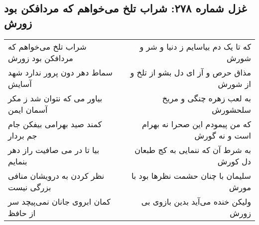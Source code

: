 \begin{center}
\section*{غزل شماره ۲۷۸: شراب تلخ می‌خواهم که مردافکن بود زورش}
\label{sec:sh278}
\begin{longtable}{l p{0.5cm} r}
شراب تلخ می‌خواهم که مردافکن بود زورش
&&
که تا یک دم بیاسایم ز دنیا و شر و شورش
\\
سماط دهر دون پرور ندارد شهد آسایش
&&
مذاق حرص و آز ای دل بشو از تلخ و از شورش
\\
بیاور می که نتوان شد ز مکر آسمان ایمن
&&
به لعب زهره چنگی و مریخ سلحشورش
\\
کمند صید بهرامی بیفکن جام جم بردار
&&
که من پیمودم این صحرا نه بهرام است و نه گورش
\\
بیا تا در می صافیت راز دهر بنمایم
&&
به شرط آن که ننمایی به کج طبعان دل کورش
\\
نظر کردن به درویشان منافی بزرگی نیست
&&
سلیمان با چنان حشمت نظرها بود با مورش
\\
کمان ابروی جانان نمی‌پیچد سر از حافظ
&&
ولیکن خنده می‌آید بدین بازوی بی زورش
\\
\end{longtable}
\end{center}
